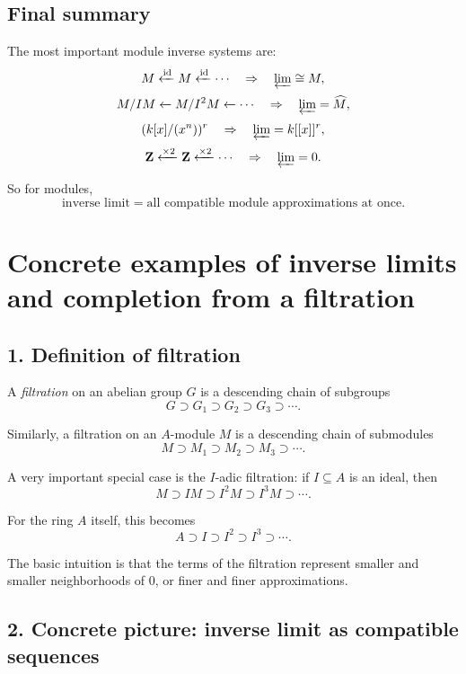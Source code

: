 \documentclass[12pt,a4paper]{article}
\theoremstyle{plain}
\theoremstyle{definition}      %
\begin{document}
	\subsection*{Final summary}
	
	The most important module inverse systems are:
	\[
	M \xleftarrow{\mathrm{id}} M \xleftarrow{\mathrm{id}} \cdots
	\quad\Rightarrow\quad
	\varprojlim \cong M,
	\]
	\[
	M/IM \xleftarrow{} M/I^2M \xleftarrow{} \cdots
	\quad\Rightarrow\quad
	\varprojlim=\widehat M,
	\]
	\[
	(k[x]/(x^n))^r
	\quad\Rightarrow\quad
	\varprojlim = k[[x]]^r,
	\]
	\[
	\mathbf Z \xleftarrow{\times2} \mathbf Z \xleftarrow{\times2} \cdots
	\quad\Rightarrow\quad
	\varprojlim=0.
	\]
	
	So for modules,
	\[
	\boxed{
		\text{inverse limit}=
		\text{all compatible module approximations at once}.
	}
	\]
	
	\section*{Concrete examples of inverse limits and completion from a filtration}
	
	\subsection*{1. Definition of filtration}
	
	A \emph{filtration} on an abelian group \(G\) is a descending chain of subgroups
	\[
	G \supset G_1 \supset G_2 \supset G_3 \supset \cdots.
	\]
	
	Similarly, a filtration on an \(A\)-module \(M\) is a descending chain of submodules
	\[
	M \supset M_1 \supset M_2 \supset M_3 \supset \cdots.
	\]
	
	A very important special case is the \(I\)-adic filtration: if \(I\subseteq A\) is an ideal, then
	\[
	M \supset IM \supset I^2M \supset I^3M \supset \cdots.
	\]
	
	For the ring \(A\) itself, this becomes
	\[
	A \supset I \supset I^2 \supset I^3 \supset \cdots.
	\]
	
	The basic intuition is that the terms of the filtration represent smaller and smaller neighborhoods of \(0\), or finer and finer approximations.
	
	\subsection*{2. Concrete picture: inverse limit as compatible sequences}
	
\end{document}
